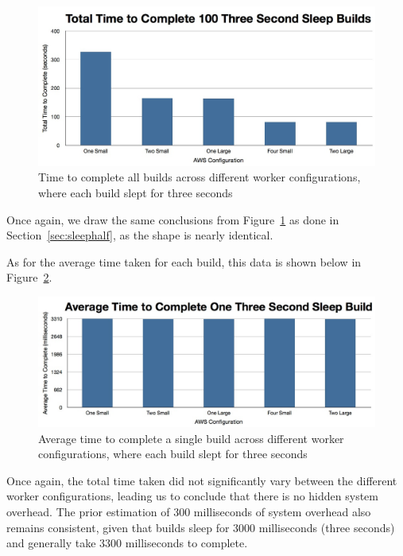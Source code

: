 \documentclass{scrartcl}
\begin{document}
\begin{figure}[here]
  \begin{center}
    \includegraphics[scale=0.45]{raw_data/sleep3/time_to_complete_all.jpg}
  \end{center}
  \caption{Time to complete all builds across different worker configurations, where each build slept for three seconds}
  \label{fig:sleep3_all}
\end{figure}

Once again, we draw the same conclusions from Figure~\ref{fig:sleep3_all} as done in Section~\ref{sec:sleephalf}, as the shape is nearly identical.

As for the average time taken for each build, this data is shown below in Figure~\ref{fig:sleep3_each}.

\begin{figure}[here]
  \begin{center}
    \includegraphics[scale=0.45]{raw_data/sleep3/time_to_complete_each.jpg}
  \end{center}
  \caption{Average time to complete a single build across different worker configurations, where each build slept for three seconds}
  \label{fig:sleep3_each}
\end{figure}

Once again, the total time taken did not significantly vary between the different worker configurations, leading us to conclude that there is no hidden system overhead.
The prior estimation of 300 milliseconds of system overhead also remains consistent, given that builds sleep for 3000 milliseconds (three seconds) and generally take 3300 milliseconds to complete.
\end{document}
